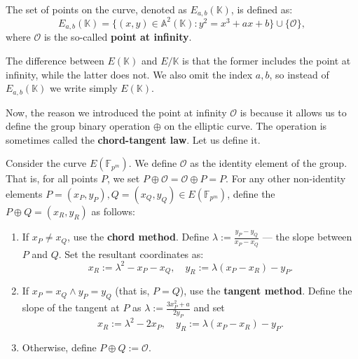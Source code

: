 \documentclass[../lecture-notes.tex]{subfiles}
\begin{document}
\begin{definition}
    The set of points on the curve, denoted as $E_{a,b}(\mathbb{K})$, is defined as:
    \begin{equation*}
        E_{a,b}(\mathbb{K}) = \{(x,y) \in \mathbb{A}^2(\mathbb{K}): y^2=x^3+ax+b\} \cup \{\mathcal{O}\},
    \end{equation*}
    where $\mathcal{O}$ is the so-called \textbf{point at infinity}.
\end{definition}

\begin{remark}
    The difference between $E(\mathbb{K})$ and $E/\mathbb{K}$ is that the former includes the point at infinity, while the latter does not. We also omit the index $a,b$, so instead of $E_{a,b}(\mathbb{K})$ we write simply $E(\mathbb{K})$.
\end{remark}

Now, the reason we introduced the point at infinity $\mathcal{O}$ is because it allows us to define the group binary operation $\oplus$ on the elliptic curve. The operation is sometimes called the \textbf{chord-tangent law}. Let us define it.

\begin{definition}
    Consider the curve $E(\mathbb{F}_{p^m})$. We define $\mathcal{O}$ as the identity element of the group. That is, for all points $P$, we set $P \oplus \mathcal{O} = \mathcal{O} \oplus P = P$. For any other non-identity elements $P=(x_P,y_P),Q=(x_Q,y_Q) \in E(\mathbb{F}_{p^m})$, define the $P\oplus Q = (x_R,y_R)$ as follows:
    \begin{enumerate}
        \item If $x_P\neq x_Q$, use the \textbf{chord method}. Define $\lambda := \frac{y_P-y_Q}{x_P-x_Q}$ --- the slope between $P$ and $Q$. Set the resultant coordinates as:
        \begin{equation*}
            x_R := \lambda^2 - x_P - x_Q, \quad y_R := \lambda(x_P-x_R)-y_P.
        \end{equation*}
        \item If $x_P=x_Q \wedge y_P=y_Q$ (that is, $P=Q$), use the \textbf{tangent method}. Define the slope of the tangent at $P$ as $\lambda := \frac{3x_P^2+a}{2y_P}$ and set
        \begin{equation*}
            x_R := \lambda^2 - 2x_P, \quad y_R := \lambda(x_P-x_R)-y_P.
        \end{equation*}
        \item Otherwise, define $P \oplus Q := \mathcal{O}$.
    \end{enumerate}
\end{definition}
\end{document}
